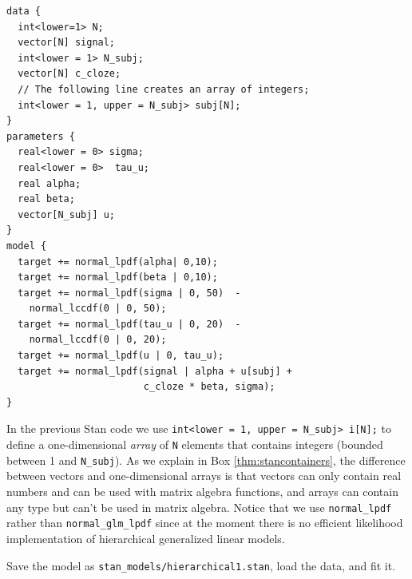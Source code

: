 \documentclass[12pt,]{krantz}
\theoremstyle{definition}
\theoremstyle{definition}
\theoremstyle{definition}
\theoremstyle{remark}
\begin{document}
\begin{verbatim}
data {
  int<lower=1> N;
  vector[N] signal;
  int<lower = 1> N_subj;
  vector[N] c_cloze;
  // The following line creates an array of integers;
  int<lower = 1, upper = N_subj> subj[N]; 
}
parameters {
  real<lower = 0> sigma;
  real<lower = 0>  tau_u;   
  real alpha;
  real beta;
  vector[N_subj] u;
}
model {
  target += normal_lpdf(alpha| 0,10);
  target += normal_lpdf(beta | 0,10);
  target += normal_lpdf(sigma | 0, 50)  -
    normal_lccdf(0 | 0, 50);
  target += normal_lpdf(tau_u | 0, 20)  -
    normal_lccdf(0 | 0, 20);
  target += normal_lpdf(u | 0, tau_u);
  target += normal_lpdf(signal | alpha + u[subj] +
                        c_cloze * beta, sigma);
}
\end{verbatim}

In the previous Stan code we use
\texttt{int\textless{}lower\ =\ 1,\ upper\ =\ N\_subj\textgreater{}\ i{[}N{]};}
to define a one-dimensional \emph{array} of \texttt{N} elements that
contains integers (bounded between 1 and \texttt{N\_subj}). As we
explain in Box \ref{thm:stancontainers}, the difference between vectors
and one-dimensional arrays is that vectors can only contain real numbers
and can be used with matrix algebra functions, and arrays can contain
any type but can't be used in matrix algebra. Notice that we use
\texttt{normal\_lpdf} rather than \texttt{normal\_glm\_lpdf} since at
the moment there is no efficient likelihood implementation of
hierarchical generalized linear models.

Save the model as \texttt{stan\_models/hierarchical1.stan}, load the
data, and fit it.
\end{document}
